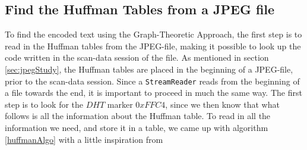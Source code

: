 \subsection{Find the Huffman Tables from a JPEG file}
\label{sec:DesignHuffman}
To find the encoded text using the Graph-Theoretic Approach, the first step is to read in the Huffman tables from the JPEG-file, making it possible to look up the code written in the scan-data session of the file.
As mentioned in section \ref{sec:jpegStudy}, the Huffman tables are placed in the beginning of a JPEG-file, prior to the scan-data session.
Since a \lstinline|StreamReader| reads from the beginning of a file towards the end, it is important to proceed in much the same way.
The first step is to look for the $DHT$ marker $0xFFC4$, since we then know that what follows is all the information about the Huffman table.
To read in all the information we need, and store it in a table, we came up with algorithm \ref{huffmanAlgo} with a little inspiration from \cite{HuffmanDecoding}

